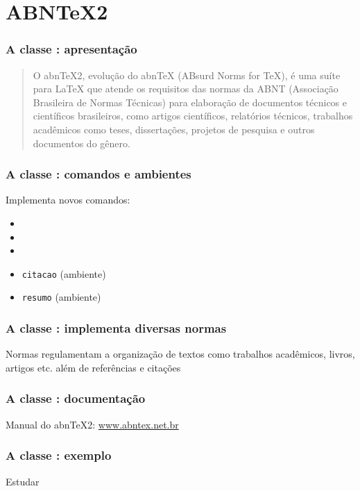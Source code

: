 \section{ABN\TeX2}

\begin{frame}
  \frametitle{A classe : apresentação}
  \large
  \begin{quote}
    O abnTeX2, evolução do abnTeX (ABsurd Norms for TeX), é uma suíte para
    LaTeX que atende os requisitos das normas da ABNT (Associação Brasileira de
    Normas Técnicas) para elaboração de documentos técnicos e científicos
    brasileiros, como artigos científicos, relatórios técnicos, trabalhos
    acadêmicos como teses, dissertações, projetos de pesquisa e outros
    documentos do gênero.
  \end{quote}
\end{frame}

\begin{frame}
  \frametitle{A classe : comandos e ambientes}
  \LARGE
  Implementa novos comandos:

  \begin{itemize}
    \item\texttt{\titulo}
    \item\texttt{\autor}
    \item\texttt{\imprimircapa}
    \item\texttt{citacao} (ambiente)
    \item\texttt{resumo} (ambiente)
  \end{itemize}
\end{frame}

\begin{frame}
  \frametitle{A classe : implementa diversas normas}
  \LARGE
  Normas regulamentam a organização de textos como trabalhos acadêmicos,
  livros, artigos etc. além de referências e citações
\end{frame}

\begin{frame}
  \frametitle{A classe : documentação}
  \LARGE
  Manual do abnTeX2: \url{www.abntex.net.br}
\end{frame}

\begin{frame}
  \frametitle{A classe : exemplo}
  \huge
  Estudar 
\end{frame}
